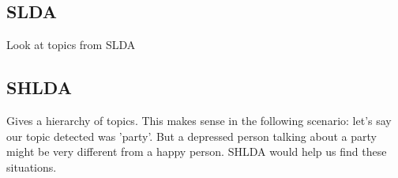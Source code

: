 \subsection{SLDA}
Look at topics from SLDA
\subsection{SHLDA}
Gives a hierarchy of topics. This makes sense in the following scenario: let's say our topic detected was 'party'. But a depressed person talking about a party might be very different from a happy person. SHLDA would help us find these situations.